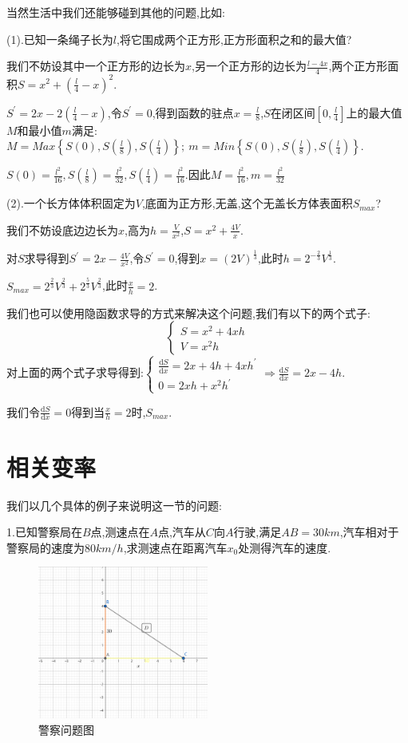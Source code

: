 \documentclass[oneside]{book}
\begin{document}
	当然生活中我们还能够碰到其他的问题,比如:
	
	(1).已知一条绳子长为$l$,将它围成两个正方形,正方形面积之和的最大值?
	
	我们不妨设其中一个正方形的边长为$x$,另一个正方形的边长为$\frac{l-4x}{4}$,两个正方形面积$S=x^{2}+(\frac{l}{4}-x)^{2}$.
	
	$S^{'}=2x-2(\frac{l}{4}-x)$,令$S^{'}=0$,得到函数的驻点$x=\frac{l}{8}$,$S$在闭区间$[0,\frac{l}{4}]$上的最大值$M$和最小值$m$满足:$M=Max\left\lbrace S(0),S(\frac{l}{8}),S(\frac{l}{4})\right\rbrace;\ m=Min\left\lbrace S(0),S(\frac{l}{8}),S(\frac{l}{4})\right\rbrace $.
	
	$S(0)=\frac{l^{2}}{16},S(\frac{l}{8})=\frac{l^{2}}{32},S(\frac{l}{4})=\frac{l^{2}}{16}$.因此$M=\frac{l^{2}}{16},m=\frac{l^{2}}{32}$
	
	(2).一个长方体体积固定为$V$,底面为正方形,无盖,这个无盖长方体表面积$S_{max}$?
	
	我们不妨设底边边长为$x$,高为$h=\frac{V}{x^{2}}$,$S=x^{2}+\frac{4V}{x}$.
	
	对$S$求导得到$S^{'}=2x-\frac{4V}{x^{2}}$,令$S^{'}=0$,得到$x=(2V)^{\frac{1}{3}}$,此时$h=2^{-\frac{2}{3}}V^{\frac{1}{3}}$.
	
	$S_{max}=2^{\frac{2}{3}}V^{\frac{2}{3}}+2^{\frac{5}{3}}V^{\frac{2}{3}}$,此时$\frac{x}{h}=2$.
	
	我们也可以使用隐函数求导的方式来解决这个问题,我们有以下的两个式子:
	$$\left\{\begin{array}{c}
		S=x^{2}+4xh\\V=x^{2}h
	\end{array}\right.$$
	对上面的两个式子求导得到:$\left\{\begin{array}{c}
		\frac{\mathrm{d}S}{\mathrm{d}x}=2x+4h+4xh^{'}\\0=2xh+x^{2}h^{'}
	\end{array}\right.\Rightarrow \frac{\mathrm{d}S}{\mathrm{d}x}=2x-4h$.
	
	我们令$\frac{\mathrm{d}S}{\mathrm{d}x}=0$得到当$\frac{x}{h}=2$时,$S_{max}.$
	\chapter{相关变率}
	我们以几个具体的例子来说明这一节的问题:
	
	1.已知警察局在$B$点,测速点在$A$点,汽车从$C$向$A$行驶,满足$AB=30km$,汽车相对于警察局的速度为$80km/h$,求测速点在距离汽车$x_{0}$处测得汽车的速度.
	\begin{figure}[htbp]
		\centering
		\includegraphics[width=0.5\textwidth]{picturetwo.png}
		\caption{警察问题图}
	\end{figure}
\end{document}
